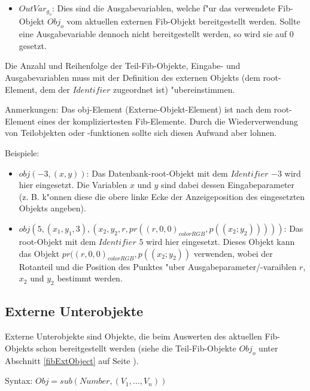 \begin{itemize}
 \item $OutVar_{g_o}$: Dies sind die Ausgabevariablen, welche f"ur das verwendete Fib-Objekt $Obj_o$ vom aktuellen externen Fib-Objekt bereitgestellt werden. Sollte eine Ausgabevariable dennoch nicht bereitgestellt werden, so wird sie auf $0$ gesetzt.
\end{itemize}

Die Anzahl und Reihenfolge der Teil-Fib-Objekte, Eingabe- und Ausgabevariablen muss mit der Definition des externen Objekts (dem root-Element, dem der $Identifier$ zugeordnet ist) "ubereinstimmen.

\bigskip\noindent
Anmerkungen:
Das obj-Element (Externe-Objekt-Element) ist nach dem root-Element eines der kompliziertesten Fib-Elemente. Durch die Wiederverwendung von Teilobjekten oder -funktionen sollte sich diesen Aufwand aber lohnen.

\bigskip\noindent
Beispiele:
\begin{itemize}
 \item $obj( -3 , (x, y) )$: Das Datenbank-root-Objekt mit dem $Identifier$ $-3$ wird hier eingesetzt. Die Variablen $x$ und $y$ sind dabei dessen Eingabeparameter (z. B. k"onnen diese die obere linke Ecke der Anzeigeposition des eingesetzten Objekts angeben).
 \item $obj( 5 , ( x_1, y_1, 3 ) , ( x_2, y_2, r, pr( (r, 0, 0)_{colorRGB}, p((x_2;y_2)) ) ) )$: Das root-Objekt mit dem $Identifier$ $5$ wird hier eingesetzt. Dieses Objekt kann das Objekt $pr( (r, 0, 0)_{colorRGB}, p((x_2;y_2))$ verwenden, wobei der Rotanteil und die Position des Punktes "uber Ausgabeparameter/-varaiblen $r$, $x_2$ und $y_2$ bestimmt werden.
\end{itemize}



\subsection{Externe Unterobjekte}
\label{fibSubobject}\label{secExtSubobjectElement}

Externe Unterobjekte sind Objekte, die beim Auswerten des aktuellen Fib-Objekts schon bereitgestellt werden (siehe die Teil-Fib-Objekte $Obj_o$ unter Abschnitt \ref{fibExtObject} auf Seite \pageref{fibExtObject}).

\bigskip\noindent
Syntax:
$Obj = sub( Number , ( V_1 , \ldots , V_n ) )$

